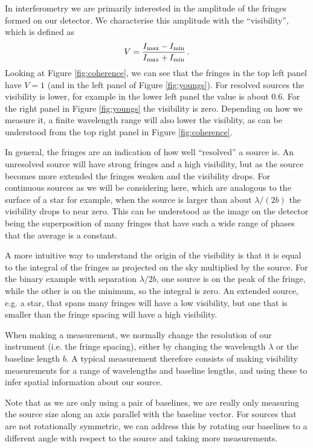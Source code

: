 \documentclass[11pt]{article}
\begin{document}
In interferometry we are primarily interested in the amplitude of the fringes formed on our detector. We characterise this amplitude with the ``visibility'', which is defined as
\begin{equation}
    V = \frac{I_{\rm max} - I_{\rm min}}{I_{\rm max} + I_{\rm min}} \, .
\end{equation}
Looking at Figure \ref{fig:coherence}, we can see that the fringes in the top left panel have $V=1$ (and in the left panel of Figure \ref{fig:youngs}). For resolved sources the visibility is lower, for example in the lower left panel the value is about 0.6. For the right panel in Figure \ref{fig:youngs} the visibility is zero. Depending on how we measure it, a finite wavelength range will also lower the visiblity, as can be understood from the top right panel in Figure \ref{fig:coherence}.

In general, the fringes are an indication of how well ``resolved'' a source is. An unresolved source will have strong fringes and a high visibility, but as the source becomes more extended the fringes weaken and the visibility drops. For continuous sources as we will be considering here, which are analogous to the surface of a star for example, when the source is larger than about $\lambda/(2b)$ the visibility drops to near zero. This can be understood as the image on the detector being the superposition of many fringes that have such a wide range of phases that the average is a constant.

A more intuitive way to understand the origin of the visibility is that it is equal to the integral of the fringes as projected on the sky multiplied by the source. For the binary example with separation $\lambda/2b$, one source is on the peak of the fringe, while the other is on the minimum, so the integral is zero. An extended source, e.g. a star, that spans many fringes will have a low visibility, but one that is smaller than the fringe spacing will have a high visibility.

When making a measurement, we normally change the resolution of our instrument (i.e. the fringe spacing), either by changing the wavelength $\lambda$ or the baseline length $b$. A typical measurement therefore consists of making visibility measurements for a range of wavelengths and baseline lengths, and using these to infer spatial information about our source.

Note that as we are only using a pair of baselines, we are really only measuring the source size along an axis parallel with the baseline vector. For sources that are not rotationally symmetric, we can address this by rotating our baselines to a different angle with respect to the source and taking more measurements.
\end{document}
